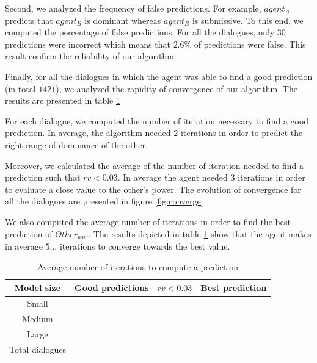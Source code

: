\documentclass[sigconf]{aamas}  %
\begin{document}
	Second, we analyzed the frequency of false predictions. For example, $agent_A$ predicts that $agent_B$ is dominant whereas $agent_B$ is submissive. To this end, we computed the percentage of false predictions. For all the dialogues, only $30$ predictions were incorrect which means that $ 2.6 \% $ of predictions were false. This result confirm the reliability of our algorithm. 
	
	Finally, for all the dialogues in which the agent was able to find a good prediction (in total $1421$), we analyzed the rapidity of convergence of our algorithm. The results are presented in table \ref{tab:conv}
	 
	For each dialogue, we computed the number of iteration necessary to find a good prediction. In average, the algorithm needed $2$ iterations in order to predict the right range of dominance of the other. 
	
	Moreover, we calculated the average of the number of iteration needed to find a prediction such that $rv <0.03$. In average the agent needed 3 iterations in order to evaluate a close value to the other's power. The evolution of convergence for all the dialogues are presented in figure  \ref{fig:converge}
	
	We  also computed the average number of iterations in order to find the best prediction of $Other_{pow}$. The results depicted in table \ref{tab:conv} show that the agent makes in average $5...$ iterations to converge towards the best value.  
	\begin{table}[t]
				\begin{tabular}{|c|c|c|c|}
					\hline
					Model size & Good predictions & $rv <0.03$ & Best prediction \\
					\hline
					Small & & & \\
					\hline
					Medium & & & \\
					\hline
					Large & & & \\
					\hline
					Total dialogues & & & \\
					\hline
				\end{tabular}
				\caption{Average number of iterations to compute a prediction} 
				\label{tab:conv}
	\end{table}
	
%			
	
\end{document}

